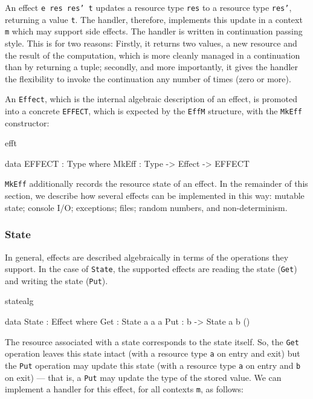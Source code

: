 An effect \texttt{e res res' t} updates a resource type \texttt{res} to a
resource type \texttt{res'}, returning a value \texttt{t}. The handler, therefore,
implements this update in a context \texttt{m} which may support side effects.
The handler is written in continuation passing style. This is for two reasons:
Firstly, it returns two values, a new resource and the result of the computation,
which is more cleanly managed in a continuation than by returning a tuple;
secondly, and more importantly, it gives the handler the flexibility to invoke
the continuation any number of times (zero or more).

An \texttt{Effect}, which is the internal algebraic description of an effect,
is promoted into a concrete \texttt{EFFECT}, which is expected by the
\texttt{EffM} structure, with the \texttt{MkEff} constructor:

\begin{SaveVerbatim}{efft}

data EFFECT : Type where
     MkEff : Type -> Effect -> EFFECT

\end{SaveVerbatim}

\noindent
\texttt{MkEff} additionally records the resource state of an effect.
In the remainder of this section, we describe how several effects can be
implemented in this way: mutable state; console I/O; exceptions; files; random
numbers, and non-determinism.

\subsubsection{State}

In general, effects are described algebraically in terms of the operations
they support. In the case of \texttt{State}, the supported effects are reading
the state (\texttt{Get}) and writing the state (\texttt{Put}).

\begin{SaveVerbatim}{statealg}

data State : Effect where
     Get :      State a a a
     Put : b -> State a b ()

\end{SaveVerbatim}

\noindent
The resource associated with a state corresponds to the state itself. So,
the \texttt{Get} operation leaves this state intact (with a resource type
\texttt{a} on entry and exit) but the \texttt{Put} operation may update this
state (with a resource type \texttt{a} on entry and \texttt{b} on exit)
--- that is, a \texttt{Put} may update the type of the stored value.
We can implement a handler for this effect, for all contexts \texttt{m},
as follows:

